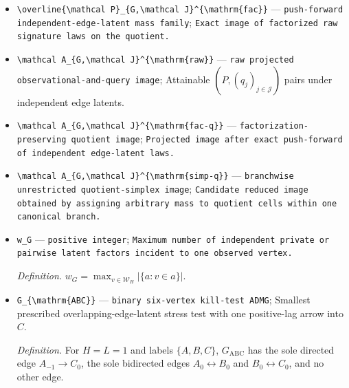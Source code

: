 \documentclass{article}
\begin{document}
\begin{itemize}
  \item \texttt{\textbackslash{}\allowbreak{}overline\{\textbackslash{}\allowbreak{}mathcal P\}\allowbreak{}\_\allowbreak{}\{G,\allowbreak{}\textbackslash{}\allowbreak{}mathcal J\}\allowbreak{}\textasciicircum{}\{\textbackslash{}\allowbreak{}mathrm\{fac\}\allowbreak{}\}\allowbreak{}} --- \texttt{push-\allowbreak{}forward independent-\allowbreak{}edge-\allowbreak{}latent mass family}; \texttt{Exact image of factorized raw signature laws on the quotient.}
  \item \texttt{\textbackslash{}\allowbreak{}mathcal A\_\allowbreak{}\{G,\allowbreak{}\textbackslash{}\allowbreak{}mathcal J\}\allowbreak{}\textasciicircum{}\{\textbackslash{}\allowbreak{}mathrm\{raw\}\allowbreak{}\}\allowbreak{}} --- \texttt{raw projected observational-\allowbreak{}and-\allowbreak{}query image}; Attainable \((P,(q_j)_{j\in\mathcal J})\) pairs under independent edge latents.
  \item \texttt{\textbackslash{}\allowbreak{}mathcal A\_\allowbreak{}\{G,\allowbreak{}\textbackslash{}\allowbreak{}mathcal J\}\allowbreak{}\textasciicircum{}\{\textbackslash{}\allowbreak{}mathrm\{fac-\allowbreak{}q\}\allowbreak{}\}\allowbreak{}} --- \texttt{factorization-\allowbreak{}preserving quotient image}; \texttt{Projected image after exact push-\allowbreak{}forward of independent edge-\allowbreak{}latent laws.}
  \item \texttt{\textbackslash{}\allowbreak{}mathcal A\_\allowbreak{}\{G,\allowbreak{}\textbackslash{}\allowbreak{}mathcal J\}\allowbreak{}\textasciicircum{}\{\textbackslash{}\allowbreak{}mathrm\{simp-\allowbreak{}q\}\allowbreak{}\}\allowbreak{}} --- \texttt{branchwise unrestricted quotient-\allowbreak{}simplex image}; \texttt{Candidate reduced image obtained by assigning arbitrary mass to quotient cells within one canonical branch.}
  \item \texttt{w\_\allowbreak{}G} --- \texttt{positive integer}; \texttt{Maximum number of independent private or pairwise latent factors incident to one observed vertex.}
  \par\smallskip\noindent\emph{Definition.} \(w_G=\max_{v\in\mathcal W_H}|\{a:v\in a\}|\).
  \item \texttt{G\_\allowbreak{}\{\textbackslash{}\allowbreak{}mathrm\{ABC\}\allowbreak{}\}\allowbreak{}} --- \texttt{binary six-\allowbreak{}vertex kill-\allowbreak{}test ADMG}; Smallest prescribed overlapping-edge-latent stress test with one positive-lag arrow into \(C\).
  \par\smallskip\noindent\emph{Definition.} For \(H=L=1\) and labels \(\{A,B,C\}\), \(G_{\mathrm{ABC}}\) has the sole directed edge \(A_{-1}\to C_0\), the sole bidirected edges \(A_0\leftrightarrow B_0\) and \(B_0\leftrightarrow C_0\), and no other edge.

\end{itemize}
\end{document}
